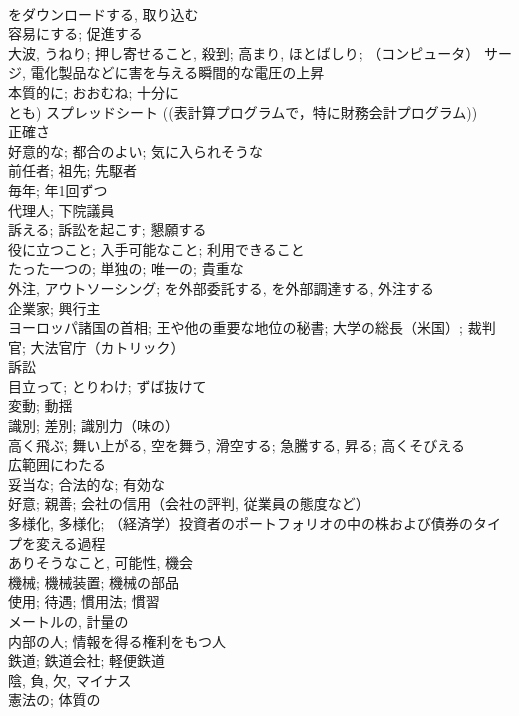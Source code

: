 \documentclass[8pt]{extreport}
\begin{document}
\begin{CJK}{UTF8}{min}
\\	をダウンロードする, 取り込む	
\\	容易にする; 促進する	
\\	大波, うねり; 押し寄せること, 殺到; 高まり, ほとばしり; （コンピュータ） サージ, 電化製品などに害を与える瞬間的な電圧の上昇	
\\	本質的に; おおむね; 十分に	
\\	とも) スプレッドシート ((表計算プログラムで，特に財務会計プログラム))	
\\	正確さ	
\\	好意的な; 都合のよい; 気に入られそうな	
\\	前任者; 祖先; 先駆者	
\\	毎年; 年1回ずつ	
\\	代理人; 下院議員	
\\	訴える; 訴訟を起こす; 懇願する	
\\	役に立つこと; 入手可能なこと; 利用できること	
\\	たった一つの; 単独の; 唯一の; 貴重な	
\\	外注, アウトソーシング; を外部委託する, を外部調達する, 外注する	
\\	企業家; 興行主	
\\	ヨーロッパ諸国の首相; 王や他の重要な地位の秘書; 大学の総長（米国）; 裁判官; 大法官庁（カトリック）	
\\	訴訟	
\\	目立って; とりわけ; ずば抜けて	
\\	変動; 動揺	
\\	識別; 差別; 識別力（味の）	
\\	高く飛ぶ; 舞い上がる, 空を舞う, 滑空する; 急騰する, 昇る; 高くそびえる	
\\	広範囲にわたる	
\\	妥当な; 合法的な; 有効な	
\\	好意; 親善; 会社の信用（会社の評判, 従業員の態度など）	
\\	多様化, 多様化; （経済学）投資者のポートフォリオの中の株および債券のタイプを変える過程	
\\	ありそうなこと, 可能性, 機会	
\\	機械; 機械装置; 機械の部品	
\\	使用; 待遇; 慣用法; 慣習	
\\	メートルの, 計量の	
\\	内部の人; 情報を得る権利をもつ人	
\\	鉄道; 鉄道会社; 軽便鉄道	
\\	陰, 負, 欠, マイナス	
\\	憲法の; 体質の	

\end{CJK}
\end{document}
